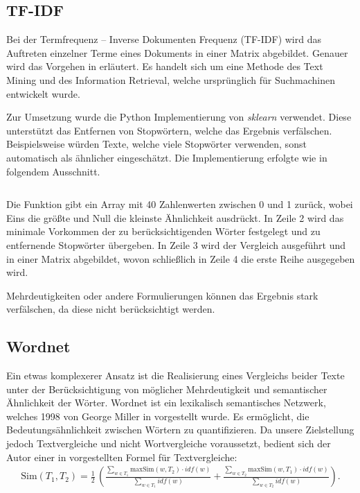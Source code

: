 \documentclass[11pt,a4paper]{article}
\begin{document}
\subsection{TF-IDF}

Bei der Termfrequenz -- Inverse Dokumenten Frequenz (TF-IDF) wird das
Auftreten einzelner Terme eines Dokuments in einer Matrix abgebildet.  Genauer
wird das Vorgehen in \cite{baeza1999modern} erläutert.  Es handelt sich um
eine Methode des Text Mining und des Information Retrieval, welche
ursprünglich für Suchmachinen entwickelt wurde.

Zur Umsetzung wurde die Python Implementierung von \textit{sklearn} verwendet.
Diese unterstützt das Entfernen von Stopwörtern, welche das Ergebnis
verfälschen.  Beispielsweise würden Texte, welche viele Stopwörter verwenden,
sonst automatisch als ähnlicher eingeschätzt.  Die Implementierung erfolgte
wie in folgendem Ausschnitt.

\inputminted[frame=lines, framesep=2mm, linenos, breaklines]{python}{./listings/tfidf.py}

Die Funktion gibt ein Array mit 40 Zahlenwerten zwischen 0 und 1 zurück, wobei
Eins die größte und Null die kleinste Ähnlichkeit ausdrückt.  In Zeile 2 wird
das minimale Vorkommen der zu berücksichtigenden Wörter festgelegt und zu
entfernende Stopwörter übergeben.  In Zeile 3 wird der Vergleich ausgeführt
und in einer Matrix abgebildet, wovon schließlich in Zeile 4 die erste Reihe
ausgegeben wird.

Mehrdeutigkeiten oder andere Formulierungen können das Ergebnis stark
verfälschen, da diese nicht berücksichtigt werden.

\subsection{Wordnet}

Ein etwas komplexerer Ansatz ist die Realisierung eines Vergleichs beider
Texte unter der Berücksichtigung von möglicher Mehrdeutigkeit und semantischer
Ähnlichkeit der Wörter.  Wordnet ist ein lexikalisch semantisches Netzwerk,
welches 1998 von George Miller in \cite{miller1998wordnet} vorgestellt wurde.
Es ermöglicht, die Bedeutungsähnlichkeit zwischen Wörtern zu quantifizieren.
Da unsere Zielstellung jedoch Textvergleiche und nicht Wortvergleiche
voraussetzt, bedient sich der Autor einer in \cite{mihalcea2006corpus}
vorgestellten Formel für Textvergleiche:
\begin{gather*}
  \text{Sim}(T_1,T_2)=\frac12\,\left(\frac{\sum_{w\in T_1}{
      \text{maxSim}(w,T_2)\cdot idf(w)}}{\sum_{w\in T_1}{idf(w)}} +
  \frac{\sum_{w\in T_2}{\text{maxSim}(w,T_1)\cdot idf(w)}}{
    \sum_{w\in T_2}{idf(w)}}\right).
\end{gather*}
\end{document}

